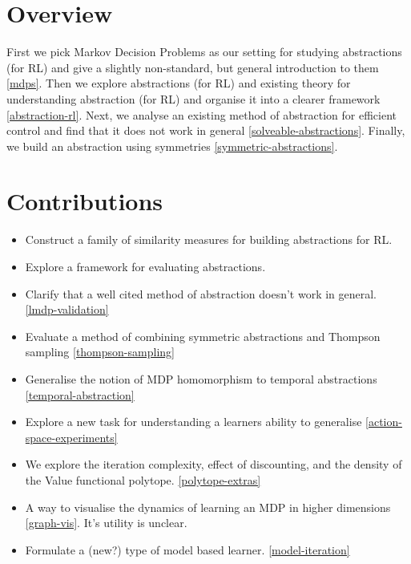 \section{Overview}

First we pick Markov Decision Problems as our setting for studying abstractions (for RL) and give a slightly non-standard, but general introduction to them \ref{mdps}.
Then we explore abstractions (for RL) and existing theory for understanding abstraction (for RL) and organise it into a clearer framework \ref{abstraction-rl}.
Next, we analyse an existing method of abstraction for efficient control and find that it does not work in general \ref{solveable-abstractions}.
Finally, we build an abstraction using symmetries \ref{symmetric-abstractions}.

\section{Contributions}

\begin{itemize}
  \tightlist
  \item Construct a family of similarity measures for building abstractions for RL.
  \item Explore a framework for evaluating abstractions.
  \item Clarify that a well cited method of abstraction doesn't work in general. \ref{lmdp-validation}
  \item Evaluate a method of combining symmetric abstractions and Thompson sampling \ref{thompson-sampling}
  \item Generalise the notion of MDP homomorphism to temporal abstractions \ref{temporal-abstraction}
  \item Explore a new task for understanding a learners ability to generalise \ref{action-space-experiments}
  \item We explore the iteration complexity, effect of discounting, and the density of the Value functional polytope. \ref{polytope-extras}
  \item A way to visualise the dynamics of learning an MDP in higher dimensions \ref{graph-vis}. It's utility is unclear.
  \item Formulate a (new?) type of model based learner. \ref{model-iteration}
\end{itemize}
